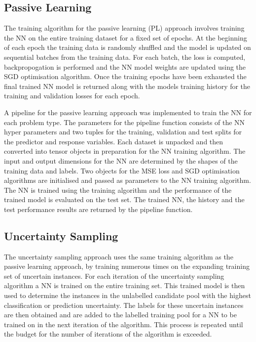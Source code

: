 \documentclass[conference]{IEEEtran}
\begin{document}
	\subsection{Passive Learning}
	The training algorithm for the passive learning (PL) approach involves training the NN on the entire training dataset for a fixed set of epochs. At the beginning of each epoch the training data is randomly shuffled and the model is updated on sequential batches from the training data. For each batch, the loss is computed, backpropogation is performed and the NN model weights are updated using the SGD optimisation algorithm. Once the training epochs have been exhausted the final trained NN model is returned along with the models training history for the training and validation losses for each epoch.
	
	A pipeline for the passive learning approach was implemented to train the NN for each problem type. The parameters for the pipeline function consists of the NN hyper parameters and two tuples for the training, validation and test splits for the predictor and response variables. Each dataset is unpacked and then converted into tensor objects in preparation for the NN training algorithm. The input and output dimensions for the NN are determined by the shapes of the training data and labels. Two objects for the MSE loss and SGD optimisation algorithms are initialised and passed as parameters to the NN training algorithm. The NN is trained using the training algorithm and the performance of the trained model is evaluated on the test set. The trained NN, the history and the test performance results are returned by the pipeline function.
	
	\subsection{Uncertainty Sampling}
	The uncertainty sampling approach uses the same training algorithm as the passive learning approach, by training numerous times on the expanding training set of uncertain instances. For each iteration of the uncertainty sampling algorithm a NN is trained on the entire training set. This trained model is then used to determine the instances in the unlabelled candidate pool with the highest classification or prediction uncertainty. The labels for these uncertain instances are then obtained and are added to the labelled training pool for a NN to be trained on in the next iteration of the algorithm. This process is repeated until the budget for the number of iterations of the algorithm is exceeded. 
	
\end{document}
